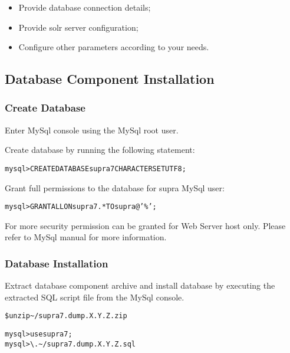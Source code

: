 \documentclass[12pt]{article}
\newcommand{\vigProjectNameShort}{supra7}
\newcommand{\vigPackageName}{supra7}
\newcommand{\vigReleasePath}{\textasciitilde/}
\begin{document}
\begin{itemize}
	\item Provide database connection details;
	\item Provide \textsf{solr} server configuration;
	\item Configure other parameters according to your needs.
\end{itemize}

\subsection{Database Component Installation}

\subsubsection{Create Database}

Enter MySql console using the MySql root user.

Create database by running the following statement:

\begin{alltt}
mysql> CREATE DATABASE \vigProjectNameShort CHARACTER SET UTF8;
\end{alltt}

Grant full permissions to the database for \textsf{supra} MySql user:

\begin{alltt}
mysql> GRANT ALL ON \vigProjectNameShort.* TO supra@'\%';
\end{alltt}

For more security permission can be granted for Web Server host only. Please refer to MySql manual for more information.

\subsubsection{Database Installation}
Extract database component archive and install database by executing the extracted SQL script file from the MySql console.

\begin{alltt}
\$ unzip {\vigReleasePath}{\vigPackageName}.dump.X.Y.Z.zip
\end{alltt}

\begin{alltt}
mysql> use \vigProjectNameShort;
mysql> \textbackslash. {\vigReleasePath}{\vigPackageName}.dump.X.Y.Z.sql
\end{alltt}
\end{document}
